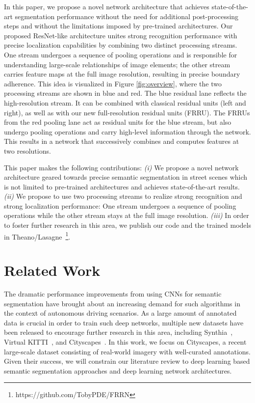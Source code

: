 \documentclass[10pt,twocolumn,letterpaper]{article}
\begin{document}
In this paper, we propose a novel network architecture that achieves state-of-the-art segmentation performance without the need for additional post-processing steps and without the limitations imposed by pre-trained architectures.
Our proposed ResNet-like architecture unites strong recognition performance with precise localization capabilities by combining two distinct processing streams.
One stream undergoes a sequence
of pooling operations and is responsible for understanding large-scale relationships of image elements; the other stream carries feature maps at the full image resolution, resulting in precise boundary adherence.
This idea is visualized in Figure \ref{fig:overview}, where the two processing streams are shown in blue and red. 
The blue residual lane reflects the high-resolution stream.
It can be combined with classical residual units (left and right), as well as with our new full-resolution residual units (FRRU).
The FRRUs from the red pooling lane act as residual units for the blue stream, but also undergo pooling operations and carry high-level information through the network.
This results in a network that successively combines and computes features at two resolutions.

This paper makes the following contributions: 
\textit{(i)} We propose a novel network architecture geared towards precise semantic segmentation in street scenes which is not limited to pre-trained architectures and achieves state-of-the-art results.
\textit{(ii)} We propose to use two processing streams to realize strong recognition and strong localization performance:
One stream undergoes a sequence of pooling operations while the other stream stays at the full image resolution.
\textit{(iii)} In order to foster further research in this area, we publish our code and the trained models in Theano/Lasagne~\cite{Theano16, Lasagne15}\footnote{https://github.com/TobyPDE/FRRN}.

\vspace{-5pt}
\section{Related Work}

The dramatic performance improvements from using CNNs for semantic segmentation have brought about an increasing demand for such algorithms in the context of autonomous driving scenarios.
As a large amount of annotated data is crucial in order to train such deep networks, multiple new datasets have been released to encourage further research in this area, including Synthia~\cite{Ros16CVPR}, Virtual KITTI~\cite{Gaidon16CVPR}, and Cityscapes~\cite{Cordts16CVPR}.
In this work, we focus on Cityscapes, a recent large-scale dataset consisting of real-world imagery with well-curated annotations. Given their success, we will constrain our literature review to deep learning based semantic segmentation approaches and deep learning network architectures.
\end{document}
